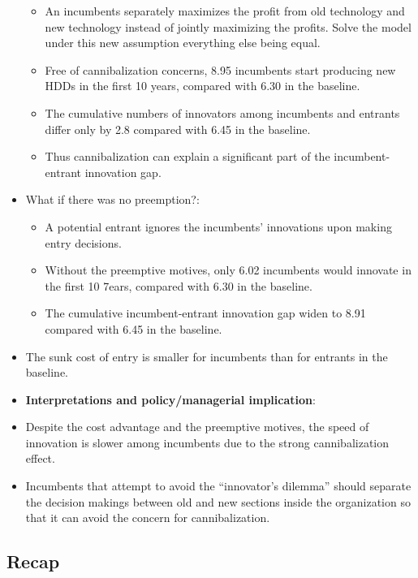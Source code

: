 \documentclass[]{book}
\providecommand{\tightlist}{%
  \setlength{\itemsep}{0pt}\setlength{\parskip}{0pt}}
\theoremstyle{definition}
\theoremstyle{definition}
\theoremstyle{definition}
\theoremstyle{remark}
\begin{document}
\begin{itemize}
  \begin{itemize}
  \tightlist
  \item
    An incumbents separately maximizes the profit from old technology
    and new technology instead of jointly maximizing the profits. Solve
    the model under this new assumption everything else being equal.
  \item
    Free of cannibalization concerns, 8.95 incumbents start producing
    new HDDs in the first 10 years, compared with 6.30 in the baseline.
  \item
    The cumulative numbers of innovators among incumbents and entrants
    differ only by 2.8 compared with 6.45 in the baseline.
  \item
    Thus cannibalization can explain a significant part of the
    incumbent-entrant innovation gap.
  \end{itemize}
\item
  What if there was no preemption?:

  \begin{itemize}
  \tightlist
  \item
    A potential entrant ignores the incumbents' innovations upon making
    entry decisions.
  \item
    Without the preemptive motives, only 6.02 incumbents would innovate
    in the first 10 7ears, compared with 6.30 in the baseline.
  \item
    The cumulative incumbent-entrant innovation gap widen to 8.91
    compared with 6.45 in the baseline.
  \end{itemize}
\item
  The sunk cost of entry is smaller for incumbents than for entrants in
  the baseline.
\item
  \textbf{Interpretations and policy/managerial implication}:
\item
  Despite the cost advantage and the preemptive motives, the speed of
  innovation is slower among incumbents due to the strong
  cannibalization effect.
\item
  Incumbents that attempt to avoid the ``innovator's dilemma'' should
  separate the decision makings between old and new sections inside the
  organization so that it can avoid the concern for cannibalization.
\end{itemize}

\subsection{Recap}\label{recap}
\end{document}

